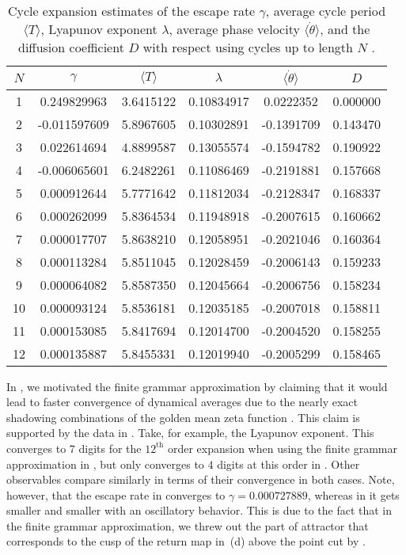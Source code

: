\documentclass[aip,cha,
reprint,
secnumarabic,
nofootinbib, tightenlines,
nobibnotes, showkeys, showpacs,
superscriptaddress,
]{revtex4-1}
\begin{document}
{\begin{table}
    \caption{Cycle expansion estimates of the escape rate $\gamma$, average
    cycle period $\langle T \rangle$, Lyapunov exponent $\lambda$, average
    phase velocity $\langle \dot{\theta} \rangle$, and the diffusion coefficient
    $D$ with respect using cycles up to length $N$ .}
    \label{t-DynamicalAveragesNoGrammar}
    \begin{tabular}{c|c|c|c|c|c}
     $N$ & $\gamma$ & $\langle T \rangle$ & $\lambda$ & $\langle \dot{\theta} \rangle$ & $D$ \\
    \hline
    1 & 0.249829963 & 3.6415122 & 0.10834917 & 0.0222352 & 0.000000 \\
    2 & -0.011597609 & 5.8967605 & 0.10302891 & -0.1391709 & 0.143470 \\
    3 & 0.022614694 & 4.8899587 & 0.13055574 & -0.1594782 & 0.190922 \\
    4 & -0.006065601 & 6.2482261 & 0.11086469 & -0.2191881 & 0.157668 \\
    5 & 0.000912644 & 5.7771642 & 0.11812034 & -0.2128347 & 0.168337 \\
    6 & 0.000262099 & 5.8364534 & 0.11948918 & -0.2007615 & 0.160662 \\
    7 & 0.000017707 & 5.8638210 & 0.12058951 & -0.2021046 & 0.160364 \\
    8 & 0.000113284 & 5.8511045 & 0.12028459 & -0.2006143 & 0.159233 \\
    9 & 0.000064082 & 5.8587350 & 0.12045664 & -0.2006756 & 0.158234 \\
    10 & 0.000093124 & 5.8536181 & 0.12035185 & -0.2007018 & 0.158811 \\
    11 & 0.000153085 & 5.8417694 & 0.12014700 & -0.2004520 & 0.158255 \\
    12 & 0.000135887 & 5.8455331 & 0.12019940 & -0.2005299 & 0.158465 \\
    \end{tabular}
\end{table}
In , we motivated the finite grammar approximation by
claiming that it would lead to faster convergence of dynamical averages 
due to the nearly exact shadowing combinations of the golden mean zeta function
. This claim is supported by the data
in . Take, for example, the
Lyapunov exponent. This converges to $7$ digits for the $12^{\mathrm{th}}$ order
expansion when using the finite grammar approximation in
, but only converges to $4$ digits at this order in
. Other observables compare similarly in
terms of their convergence in both cases. Note, however, that the escape rate
in  converges to $\gamma = 0.000727889$, whereas
in  it gets smaller and smaller with an
oscillatory behavior. This is due to the fact that in the finite grammar
approximation, we threw out the part of attractor that corresponds to the
cusp of the return map in \,(d) above the point cut 
by .

}
\end{document}
